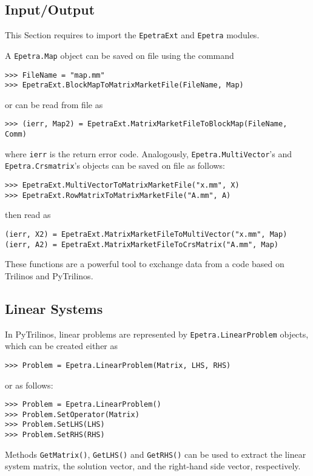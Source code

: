 \documentclass[10pt,relax]{SANDreport}
\newcommand{\PyTrilinos}{{PyTrilinos}}
\begin{document}
\subsection{Input/Output}
\label{sec:io}

This Section requires to import the {\tt EpetraExt} and {\tt Epetra} modules.

A {\tt Epetra.Map} object can be saved on file using the command
\begin{verbatim}
>>> FileName = "map.mm"
>>> EpetraExt.BlockMapToMatrixMarketFile(FileName, Map)
\end{verbatim}
or can be read from file as
\begin{verbatim}
>>> (ierr, Map2) = EpetraExt.MatrixMarketFileToBlockMap(FileName, Comm)
\end{verbatim}
where \verb!ierr! is the return error code. Analogously, 
\verb!Epetra.MultiVector!'s and \verb!Epetra.Crsmatrix!'s objects
can be saved on file as follows:
\begin{verbatim}
>>> EpetraExt.MultiVectorToMatrixMarketFile("x.mm", X)
>>> EpetraExt.RowMatrixToMatrixMarketFile("A.mm", A)
\end{verbatim}
then read as
\begin{verbatim}
(ierr, X2) = EpetraExt.MatrixMarketFileToMultiVector("x.mm", Map)
(ierr, A2) = EpetraExt.MatrixMarketFileToCrsMatrix("A.mm", Map)
\end{verbatim}
These functions are a powerful tool to exchange data from a code based on
Trilinos and PyTrilinos.

\subsection{Linear Systems}
\label{sec:linear}

In \PyTrilinos, linear problems are represented by {\tt Epetra.LinearProblem}
objects, which can be created either as
\begin{verbatim}
>>> Problem = Epetra.LinearProblem(Matrix, LHS, RHS)
\end{verbatim}
or as follows:
\begin{verbatim}
>>> Problem = Epetra.LinearProblem()
>>> Problem.SetOperator(Matrix)
>>> Problem.SetLHS(LHS)
>>> Problem.SetRHS(RHS)
\end{verbatim}
Methods \verb!GetMatrix()!, \verb!GetLHS()! and \verb!GetRHS()! can be used to
extract the linear system matrix, the solution vector, and the right-hand side
vector, respectively.
\end{document}

